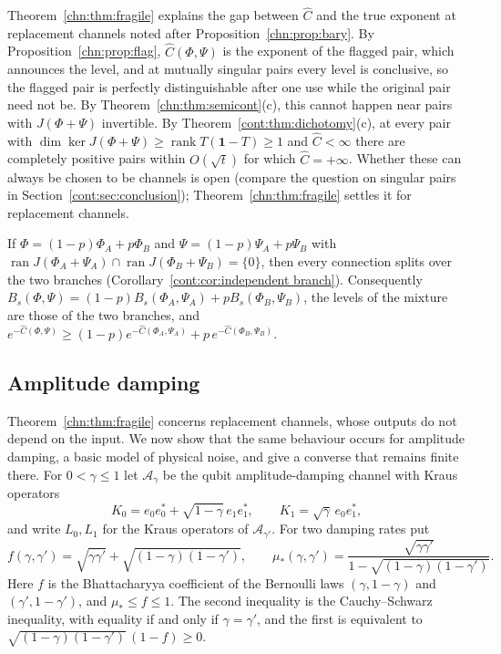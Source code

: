 Theorem~\ref{chn:thm:fragile} explains the gap between $\widehat C$ and the true exponent at replacement channels noted after Proposition~\ref{chn:prop:bary}. By Proposition~\ref{chn:prop:flag}, $\widehat C(\Phi,\Psi)$ is the exponent of the flagged pair, which announces the level, and at mutually singular pairs every level is conclusive, so the flagged pair is perfectly distinguishable after one use while the original pair need not be. By Theorem~\ref{chn:thm:semicont}(c), this cannot happen near pairs with $J(\Phi+\Psi)$ invertible. By Theorem~\ref{cont:thm:dichotomy}(c), at every pair with $\dim\ker J(\Phi+\Psi)\ge\operatorname{rank}T(\mathbf 1-T)\ge1$ and $\widehat C<\infty$ there are completely positive pairs within $O(\sqrt t)$ for which $\widehat C=+\infty$. Whether these can always be chosen to be channels is open (compare the question on singular pairs in Section~\ref{cont:sec:conclusion});
Theorem~\ref{chn:thm:fragile} settles it for replacement channels.

\begin{remark}\label{chn:rem:branches}
If $\Phi=(1-p)\Phi_A+p\Phi_B$ and $\Psi=(1-p)\Psi_A+p\Psi_B$ with $\operatorname{ran}J(\Phi_A+\Psi_A)\cap\operatorname{ran}J(\Phi_B+\Psi_B)=\{0\}$, then every connection splits over the two branches (Corollary~\ref{cont:cor:independent branch}). Consequently $B_s(\Phi,\Psi)=(1-p)B_s(\Phi_A,\Psi_A)+pB_s(\Phi_B,\Psi_B)$, the levels of the mixture are those of the two branches, and $e^{-\widehat C(\Phi,\Psi)}\ge(1-p)e^{-\widehat C(\Phi_A,\Psi_A)}+p\,e^{-\widehat C(\Phi_B,\Psi_B)}$.
\end{remark}

\subsection{Amplitude damping}\label{chn:sec:ad}

Theorem~\ref{chn:thm:fragile} concerns replacement channels, whose outputs do not depend on the input. We now show that the same behaviour occurs for amplitude damping, a basic model of physical noise, and give a converse that remains finite there. For $0<\gamma\le1$ let $\mathcal A_\gamma$ be the qubit amplitude-damping channel with Kraus operators
\[
K_0=e_0e_0^*+\sqrt{1-\gamma}\,e_1e_1^*,\qquad K_1=\sqrt\gamma\,e_0e_1^*,
\]
and write $L_0,L_1$ for the Kraus operators of $\mathcal A_{\gamma'}$. For two damping rates put
\[
f(\gamma,\gamma')=\sqrt{\gamma\gamma'}+\sqrt{(1-\gamma)(1-\gamma')},\qquad\mu_*(\gamma,\gamma')=\frac{\sqrt{\gamma\gamma'}}{1-\sqrt{(1-\gamma)(1-\gamma')}}.
\]
Here $f$ is the Bhattacharyya coefficient of the Bernoulli laws $(\gamma,1-\gamma)$ and $(\gamma',1-\gamma')$, and $\mu_*\le f\le1$. The second inequality is the Cauchy--Schwarz inequality, with equality if and only if $\gamma=\gamma'$, and the first is equivalent to $\sqrt{(1-\gamma)(1-\gamma')}\,(1-f)\ge0$.

